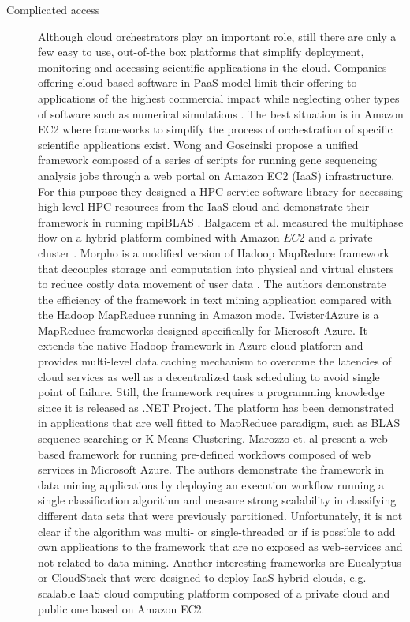 \documentclass[3p,times]{elsarticle}
\begin{document}
\begin{description}
\item[Complicated access] Although cloud orchestrators play an important role, still there are only a few easy to use, out-of-the box platforms that simplify deployment, monitoring and accessing scientific applications in the cloud. Companies offering cloud-based software in PaaS model limit their offering to applications of the highest commercial impact while neglecting other types of software such as numerical simulations \cite{CloudStack} \cite{OpenStack}. The best situation is in Amazon EC2 where frameworks to simplify the process of orchestration of specific scientific applications exist. Wong and Goscinski propose a unified framework composed of a series of scripts for running gene sequencing analysis jobs through a web portal \cite{Wong2013} on Amazon EC2 (IaaS) infrastructure. For this purpose they designed a HPC service software library for accessing high level HPC resources from the IaaS cloud and demonstrate their framework in running mpiBLAS \cite{mpiBlas}. Balgacem et al. measured the multiphase flow on a hybrid platform combined with Amazon $EC2$ and a private cluster \cite{BenBelgacem2015}. Morpho is a modified version of Hadoop MapReduce framework that decouples storage and computation into physical and virtual clusters to reduce costly data movement of user data \cite{Lu2014}. The authors demonstrate the efficiency of the  framework in text mining application compared with the Hadoop MapReduce running in Amazon mode. Twister4Azure is a MapReduce frameworks designed specifically for Microsoft Azure. It extends the native Hadoop framework in Azure cloud platform and provides multi-level data caching mechanism to overcome the latencies of cloud services as well as a decentralized task scheduling to avoid single point of failure. Still, the framework requires a programming knowledge since it is released as .NET Project. The platform has been demonstrated in applications that are well fitted to MapReduce paradigm, such as BLAS sequence searching or K-Means Clustering. Marozzo et. al \cite{catlett2013cloud} present a web-based framework for running pre-defined workflows composed of web services in Microsoft Azure. The authors demonstrate the framework in data mining applications by deploying an execution workflow running a single classification algorithm and measure strong scalability in classifying different data sets that were previously partitioned. Unfortunately, it is not clear if the algorithm was multi- or single-threaded or if is possible to add own applications to the framework that are no exposed as web-services and not related to data mining. 
Another interesting frameworks are Eucalyptus \cite{eucalyptus} or CloudStack \cite{CloudStack} that were designed to deploy IaaS hybrid clouds, e.g. scalable IaaS cloud computing platform composed of a private cloud and public one based on Amazon EC2.
\end{description}
\end{document}
